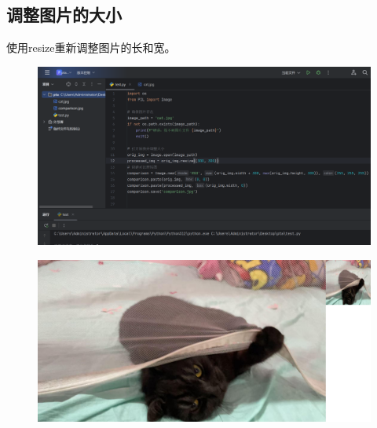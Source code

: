 \documentclass{article}
\begin{document}
\subsection{调整图片的大小}
使用resize重新调整图片的长和宽。
\begin{figure}[H]
    \centering
    \includegraphics[width=1\linewidth]{resize_code.png}
\end{figure}
\begin{figure}[H]
    \centering
    \includegraphics[width=1\linewidth]{resize_pic.png}
\end{figure}


\newpage
\end{document}
